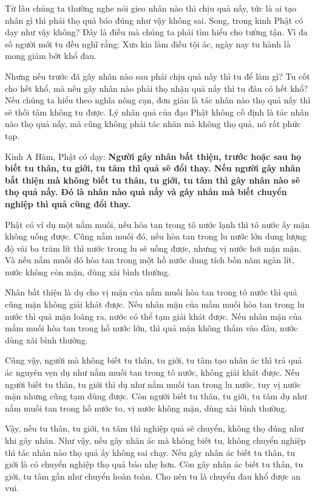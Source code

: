 \documentclass[
  12pt,
  oneside]{book}
\begin{document}
Từ lâu chúng ta thường nghe nói gieo nhân nào thì chịu quả nấy, tức là ai tạo nhân gì thì phải thọ quả báo đúng như vậy không sai. Song, trong kinh Phật có dạy như vậy không? Đây là điều mà chúng ta phải tìm hiểu cho tường tận. Vì đa số người mới tu đều nghĩ rằng: Xưa kia làm điều tội ác, ngày nay tu hành là mong giảm bớt khổ đau.

Nhưng nếu trước đã gây nhân nào sau phải chịu quả nấy thì tu để làm gì? Tu cốt cho hết khổ, mà nếu gây nhân nào phải thọ nhận quả nấy thì tu đâu có hết khổ? Nếu chúng ta hiểu theo nghĩa nông cạn, đơn giản là tác nhân nào thọ quả nấy thì sẽ thối tâm không tu được. Lý nhân quả của đạo Phật không cố định là tác nhân nào thọ quả nấy, mà cũng không phải tác nhân mà không thọ quả, nó rất phức tạp.

Kinh A Hàm, Phật có dạy: \textbf{Người gây nhân bất thiện, trước hoặc sau họ biết tu thân, tu giới, tu tâm thì quả sẽ đổi thay. Nếu người gây nhân bất thiện mà không biết tu thân, tu giới, tu tâm thì gây nhân nào sẽ thọ quả nấy. Đó là nhân nào quả nấy và gây nhân mà biết chuyển nghiệp thì quả cũng đổi thay.}

Phật có ví dụ một nắm muối, nếu hòa tan trong tô nước lạnh thì tô nước ấy mặn không uống được. Cũng nắm muối đó, nếu hòa tan trong lu nước lớn dung lượng độ vài ba trăm lít thì nước trong lu sẽ uống được, nhưng vị nước hơi mặn mặn. Và nếu nắm muối đó hòa tan trong một hồ nước dung tích bốn năm ngàn lít, nước không còn mặn, dùng xài bình thường.

Nhân bất thiện là dụ cho vị mặn của nắm muối hòa tan trong tô nước thì quả cũng mặn không giải khát được. Nếu nhân mặn của mắm muối hòa tan trong lu nước thì quả mặn loãng ra, nước có thể tạm giải khát được. Nếu nhân mặn của mắm muối hòa tan trong hồ nước lớn, thì quả mặn không thấm vào đâu, nước dùng xài bình thường.

Cũng vậy, người mà không biết tu thân, tu giới, tu tâm tạo nhân ác thì trả quả ác nguyên vẹn dụ như nắm muối tan trong tô nước, không giải khát được. Nếu người biết tu thân, tu giới thì dụ như nắm muối tan trong lu nước, tuy vị nước mặn nhưng cũng tạm dùng được. Còn người biết tu thân, tu giới, tu tâm dụ như nắm muối tan trong hồ nước to, vị nước không mặn, dùng xài bình thường.

Vậy, nếu tu thân, tu giới, tu tâm thì nghiệp quả sẽ chuyển, không thọ đúng như khi gây nhân. Như vậy, nếu gây nhân ác mà không biết tu, không chuyển nghiệp thì tác nhân nào thọ quả ấy không sai chạy. Nếu gây nhân ác biết tu thân, tu giới là có chuyển nghiệp thọ quả báo nhẹ hơn. Còn gây nhân ác biết tu thân, tu giới, tu tâm gần như chuyển hoàn toàn. Cho nên tu là chuyển đau khổ được an vui.
\end{document}
